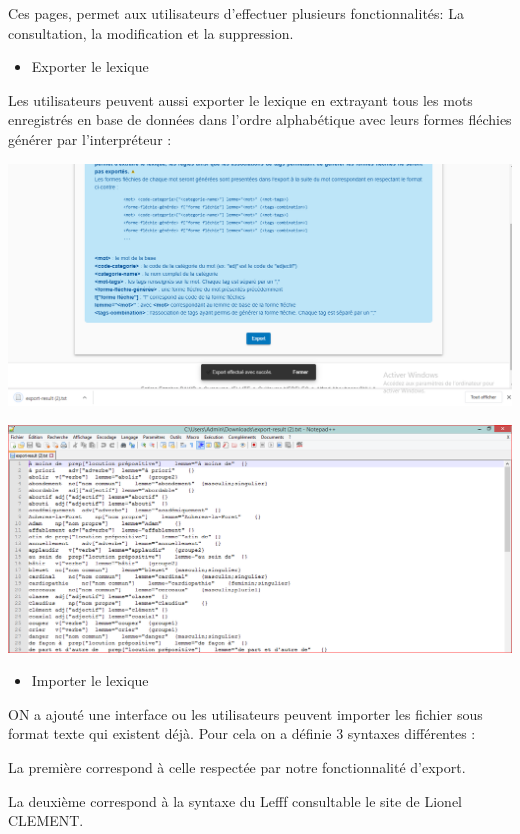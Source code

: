 \documentclass[12pt,a4paper]{article}
\begin{document}
Ces pages, permet aux utilisateurs  d'effectuer plusieurs fonctionnalités: La consultation, la modification et la suppression.




\begin{itemize}  
  \item Exporter le lexique
\end{itemize}
Les utilisateurs peuvent aussi exporter le lexique en extrayant tous les mots enregistrés en base de données dans l'ordre alphabétique avec leurs formes fléchies générer par l'interpréteur :

 \includegraphics[width=150mm]{img/ExportReussi.PNG}


 \includegraphics[width=150mm]{img/ExportTxt.PNG}

\begin{itemize}  
  \item Importer le lexique
\end{itemize}
ON a ajouté une interface ou les utilisateurs peuvent importer les fichier sous format texte qui existent déjà. Pour cela on a définie 3 syntaxes différentes : 


La  première correspond à celle respectée par notre fonctionnalité d'export.




La deuxième  correspond à la syntaxe du Lefff consultable le site de Lionel CLEMENT.
\end{document}
